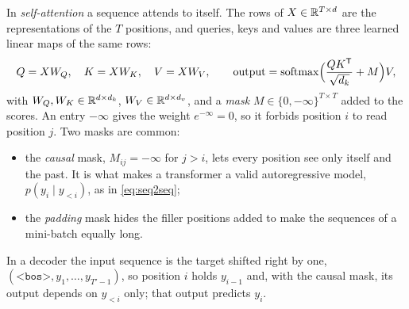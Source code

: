 \documentclass[11pt]{article}
\newcommand{\softmax}{\operatorname{softmax}}
\begin{document}
In \emph{self-attention} a sequence attends to itself. The rows of $X \in \mathbb{R}^{T \times d}$ are the representations of
the $T$ positions, and queries, keys and values are three learned linear maps of the same rows:
\begin{equation}\label{eq:selfatt}
  Q = XW_Q, \quad K = XW_K, \quad V = XW_V, \qquad \text{output} = \softmax\!\Big(\frac{QK\T}{\sqrt{d_k}} + M\Big)V ,
\end{equation}
with $W_Q, W_K \in \mathbb{R}^{d \times d_k}$, $W_V \in \mathbb{R}^{d \times d_v}$, and a \emph{mask} $M \in \{0, -\infty\}^{T \times T}$
added to the scores. An entry $-\infty$ gives the weight $e^{-\infty} = 0$, so it forbids position $i$ to read position
$j$. Two masks are common:
\begin{itemize}
\item the \emph{causal} mask, $M_{ij} = -\infty$ for $j > i$, lets every position see only itself and the past. It is what
  makes a transformer a valid autoregressive model, $p(y_i \mid y_{<i})$, as in \eqref{eq:seq2seq};
\item the \emph{padding} mask hides the filler positions added to make the sequences of a mini-batch equally long.
\end{itemize}
In a decoder the input sequence is the target shifted right by one, $(\texttt{<bos>}, y_1, \dots, y_{T'-1})$, so
position $i$ holds $y_{i-1}$ and, with the causal mask, its output depends on $y_{<i}$ only; that output predicts $y_i$.
\end{document}
